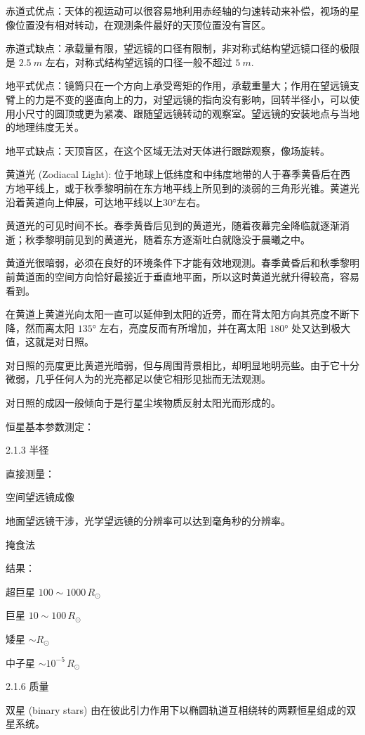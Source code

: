 \documentclass[11pt, a4paper, oneside, onecolumn]{ctexart}
\numberwithin{equation}{subsection}
\begin{document}
赤道式优点：天体的视运动可以很容易地利用赤经轴的匀速转动来补偿，视场的星像位置没有相对转动，在观测条件最好的天顶位置没有盲区。

赤道式缺点：承载量有限，望远镜的口径有限制，非对称式结构望远镜口径的极限是 $\qty{2.5}{m}$ 左右，对称式结构望远镜的口径一般不超过 $\qty{5}{m}$.

地平式优点：镜筒只在一个方向上承受弯矩的作用，承载重量大；作用在望远镜支臂上的力是不变的竖直向上的力，对望远镜的指向没有影响，回转半径小，可以使用小尺寸的圆顶或更为紧凑、跟随望远镜转动的观察室。望远镜的安装地点与当地的地理纬度无关。

地平式缺点：天顶盲区，在这个区域无法对天体进行跟踪观察，像场旋转。

黄道光 (Zodiacal Light): 位于地球上低纬度和中纬度地带的人于春季黄昏后在西方地平线上，或于秋季黎明前在东方地平线上所见到的淡弱的三角形光锥。黄道光沿着黄道向上伸展，可达地平线以上$\ang{30;;}$左右。

黄道光的可见时间不长。春季黄昏后见到的黄道光，随着夜幕完全降临就逐渐消逝；秋季黎明前见到的黄道光，随着东方逐渐吐白就隐没于晨曦之中。

黄道光很暗弱，必须在良好的环境条件下才能有效地观测。春季黄昏后和秋季黎明前黄道面的空间方向恰好最接近于垂直地平面，所以这时黄道光就升得较高，容易看到。

在黄道上黄道光向太阳一直可以延伸到太阳的近旁，而在背太阳方向其亮度不断下降，然而离太阳 $\ang{135;;}$ 左右，亮度反而有所增加，并在离太阳 $\ang{180;;}$ 处又达到极大值，这就是对日照。

对日照的亮度更比黄道光暗弱，但与周围背景相比，却明显地明亮些。由于它十分微弱，几乎任何人为的光亮都足以使它相形见拙而无法观测。

对日照的成因一般倾向于是行星尘埃物质反射太阳光而形成的。

恒星基本参数测定：

2.1.3 半径

直接测量：

空间望远镜成像

地面望远镜干涉，光学望远镜的分辨率可以达到毫角秒的分辨率。

掩食法

结果：

超巨星 $100\sim1000\,\unit{R_\odot}$

巨星	 $10\sim100\,\unit{R_\odot}$

矮星	 $\sim\unit{R_\odot}$

中子星 $\sim10^{-5}\,\unit{R_\odot}$

2.1.6 质量

双星 (binary stars) 由在彼此引力作用下以椭圆轨道互相绕转的两颗恒星组成的双星系统。
\end{document}
